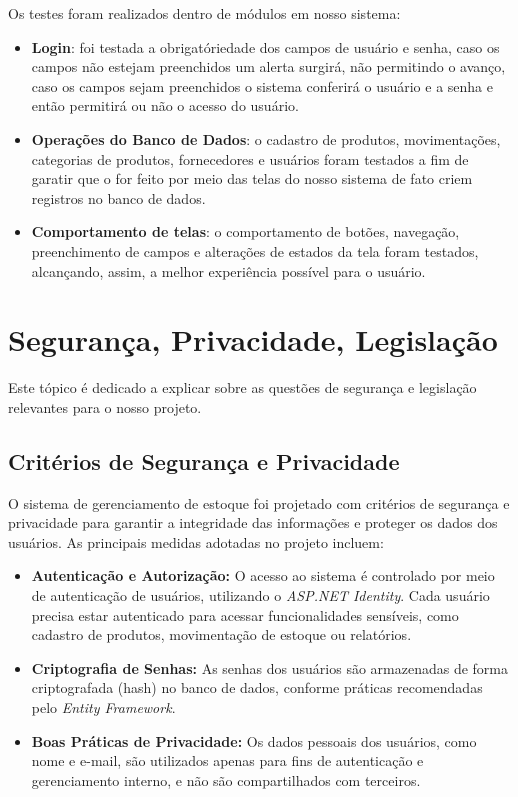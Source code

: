 \documentclass[
	12pt,				%
	openany,			%
	twoside,			%
	a4paper,			%
	english,			%
	brazil				%
	]{abntex2}
\begin{document}
Os testes foram realizados dentro de módulos em nosso sistema:

\begin{itemize}
    \item \textbf{Login}: foi testada a obrigatóriedade dos campos de usuário e senha, caso os campos não estejam preenchidos um alerta surgirá, não permitindo o avanço, caso os campos sejam preenchidos o sistema conferirá o usuário e a senha e então permitirá ou não o acesso do usuário.
    \item \textbf{Operações do Banco de Dados}: o cadastro de produtos, movimentações, categorias de produtos, fornecedores e usuários foram testados a fim de garatir que o for feito por meio das telas do nosso sistema de fato criem registros no banco de dados.
    \item \textbf{Comportamento de telas}: o comportamento de botões, navegação, preenchimento de campos e alterações de estados da tela foram testados, alcançando, assim, a melhor experiência possível para o usuário.
\end{itemize}



\section{Segurança, Privacidade, Legislação}

Este tópico é dedicado a explicar sobre as questões de segurança e legislação relevantes para o nosso projeto.

\subsection{Critérios de Segurança e Privacidade}

O sistema de gerenciamento de estoque foi projetado com critérios de segurança e privacidade para garantir a integridade das informações e proteger os dados dos usuários. As principais medidas adotadas no projeto incluem:

\begin{itemize}
    \item \textbf{Autenticação e Autorização:} O acesso ao sistema é controlado por meio de autenticação de usuários, utilizando o \textit{ASP.NET Identity}. Cada usuário precisa estar autenticado para acessar funcionalidades sensíveis, como cadastro de produtos, movimentação de estoque ou relatórios.

    \item \textbf{Criptografia de Senhas:} As senhas dos usuários são armazenadas de forma criptografada (hash) no banco de dados, conforme práticas recomendadas pelo \textit{Entity Framework}.

    \item \textbf{Boas Práticas de Privacidade:} Os dados pessoais dos usuários, como nome e e-mail, são utilizados apenas para fins de autenticação e gerenciamento interno, e não são compartilhados com terceiros.
\end{itemize}
\end{document}
